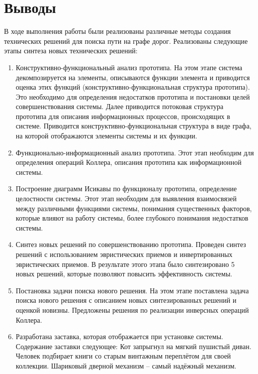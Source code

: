 \chapter{Выводы}
В ходе выполнения работы были реализованы различные методы создания технических решений для 
поиска пути на графе дорог. Реализованы следующие этапы синтеза новых технических решений: 
\begin{enumerate}
    \item Конструктивно-функциональный анализ прототипа. На этом этапе система декомпозируется на 
        элементы, описываются функции элемента и приводится оценка этих функций 
        (конструктивно-функциональная структура прототипа). Это необходимо для определения недостатков 
        прототипа и постановки целей совершенствования системы. Далее приводится потоковая структура 
        прототипа для описания информационных процессов, происходящих в системе. Приводится 
        конструктивно-функциональная структура в виде графа, на которой отображаются элементы 
        системы и их функции. 
    \item Функционально-информационный анализ прототипа. Этот этап необходим для определения 
        операций Коллера, описания прототипа как информационной системы. 
    \item Построение диаграмм Исикавы по функционалу прототипа, определение целостности системы. 
        Этот этап необходим для выявления взаимосвязей между различными функциями системы, понимания 
        существенных факторов, которые влияют на работу системы, более глубокого понимания недостатков 
        системы. 
    \item Синтез новых решений по совершенствованию прототипа. Проведен синтез решений с использованием 
        эвристических приемов и инвертированных эвристических приемов. В результате этого этапа было 
        синтезировано 5 новых решений, которые позволяют повысить эффективность системы. 
    \item Постановка задачи поиска нового решения. На этом этапе поставлена задача поиска нового 
        решения с описанием новых синтезированных решений и оценкой новизны. Предложены решения по 
        реализации инверсных операций Коллера. 
    \item Разработана заставка, которая отображается при установке системы. 
        Содержание заставки следующее: Кот запрыгнул на мягкий пушистый диван. Человек подбирает 
        книги со старым винтажным переплётом для своей коллекции. Шариковый дверной механизм -- 
        самый надёжный механизм.
\end{enumerate}